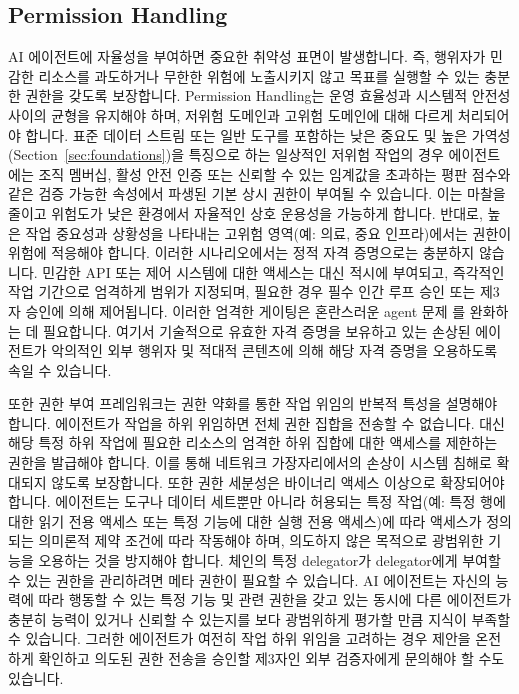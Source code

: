 \documentclass[11pt, a4paper, twocolumn, copyright, goog]{google}
\begin{document}
\subsection{Permission Handling}
\label{permission}

AI 에이전트에 자율성을 부여하면 중요한 취약성 표면이 발생합니다. 즉, 행위자가 민감한 리소스를 과도하거나 무한한 위험에 노출시키지 않고 목표를 실행할 수 있는 충분한 권한을 갖도록 보장합니다. Permission Handling는 운영 효율성과 시스템적 안전성 사이의 균형을 유지해야 하며, 저위험 도메인과 고위험 도메인에 대해 다르게 처리되어야 합니다. 표준 데이터 스트림 또는 일반 도구를 포함하는 낮은 중요도 및 높은 가역성(Section~\ref{sec:foundations})을 특징으로 하는 일상적인 저위험 작업의 경우 에이전트에는 조직 멤버십, 활성 안전 인증 또는 신뢰할 수 있는 임계값을 초과하는 평판 점수와 같은 검증 가능한 속성에서 파생된 기본 상시 권한이 부여될 수 있습니다. 이는 마찰을 줄이고 위험도가 낮은 환경에서 자율적인 상호 운용성을 가능하게 합니다. 반대로, 높은 작업 중요성과 상황성을 나타내는 고위험 영역(예: 의료, 중요 인프라)에서는 권한이 위험에 적응해야 합니다. 이러한 시나리오에서는 정적 자격 증명으로는 충분하지 않습니다. 민감한 API 또는 제어 시스템에 대한 액세스는 대신 적시에 부여되고, 즉각적인 작업 기간으로 엄격하게 범위가 지정되며, 필요한 경우 필수 인간 루프 승인 또는 제3자 승인에 의해 제어됩니다. 이러한 엄격한 게이팅은 혼란스러운 agent 문제 \citep{hardy1988confused}를 완화하는 데 필요합니다. 여기서 기술적으로 유효한 자격 증명을 보유하고 있는 손상된 에이전트가 악의적인 외부 행위자 \citep{liu2023prompt} 및 적대적 콘텐츠에 의해 해당 자격 증명을 오용하도록 속일 수 있습니다.

또한 권한 부여 프레임워크는 권한 약화를 통한 작업 위임의 반복적 특성을 설명해야 합니다. 에이전트가 작업을 하위 위임하면 전체 권한 집합을 전송할 수 없습니다. 대신 해당 특정 하위 작업에 필요한 리소스의 엄격한 하위 집합에 대한 액세스를 제한하는 권한을 발급해야 합니다. 이를 통해 네트워크 가장자리에서의 손상이 시스템 침해로 확대되지 않도록 보장합니다. 또한 권한 세분성은 바이너리 액세스 이상으로 확장되어야 합니다. 에이전트는 도구나 데이터 세트뿐만 아니라 허용되는 특정 작업(예: 특정 행에 대한 읽기 전용 액세스 또는 특정 기능에 대한 실행 전용 액세스)에 따라 액세스가 정의되는 의미론적 제약 조건에 따라 작동해야 하며, 의도하지 않은 목적으로 광범위한 기능을 오용하는 것을 방지해야 합니다. 체인의 특정 delegator가 delegator에게 부여할 수 있는 권한을 관리하려면 메타 권한이 필요할 수 있습니다. AI 에이전트는 자신의 능력에 따라 행동할 수 있는 특정 기능 및 관련 권한을 갖고 있는 동시에 다른 에이전트가 충분히 능력이 있거나 신뢰할 수 있는지를 보다 광범위하게 평가할 만큼 지식이 부족할 수 있습니다. 그러한 에이전트가 여전히 작업 하위 위임을 고려하는 경우 제안을 온전하게 확인하고 의도된 권한 전송을 승인할 제3자인 외부 검증자에게 문의해야 할 수도 있습니다.
\end{document}
